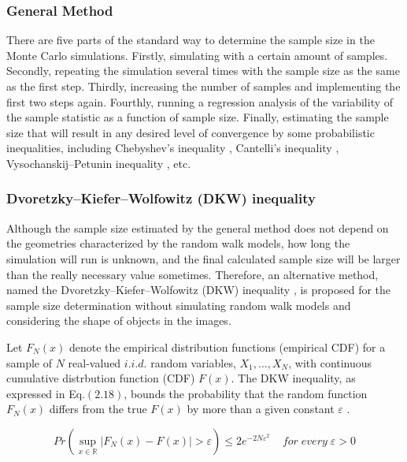 \subsubsection{General Method}

There are five parts of the standard way to determine the sample size
in the Monte Carlo simulations. Firstly, simulating with a certain
amount of samples. Secondly, repeating the simulation several times
with the sample size as the same as the first step.  Thirdly,
increasing the number of samples and implementing the first two steps
again. Fourthly, running a regression analysis of the variability of
the sample statistic as a function of sample size. Finally, estimating
the sample size that will result in any desired level of convergence
by some probabilistic inequalities, including Chebyshev's inequality
\cite{chebyshev1867valeurs}, Cantelli’s inequality
\cite{cantelli1929sui}, Vysochanskij–Petunin inequality
\cite{vysochanskij1980justification}, etc.


\subsubsection{Dvoretzky–Kiefer–Wolfowitz (DKW) inequality}

Although the sample size estimated by the general method does not
depend on the geometries characterized by the random walk models, how
long the simulation will run is unknown, and the final calculated
sample size will be larger than the really necessary value
sometimes. Therefore, an alternative method, named the
Dvoretzky–Kiefer–Wolfowitz (DKW) inequality
\cite{dvoretzky1956asymptotic}, is proposed for the sample size
determination without simulating random walk models and considering
the shape of objects in the images.

Let $F_N(x)$ denote the empirical distribution functions (empirical
CDF) for a sample of $N$ real-valued $i.i.d.$ random variables,
$X_{1}, ... , X_{N}$, with continuous cumulative distrbution function
(CDF) $F(x)$. The DKW inequality, as expressed in Eq.$(2.18)$, bounds the
probability that the random function $F_{N}(x)$ differs from the true
$F(x)$ by more than a given constant $\varepsilon$
\cite{dvoretzky1956asymptotic}.

\begin{equation}
  Pr(\sup_{x \in \mathbb{R}} |F_{N}(x) - F(x)| > \varepsilon) \leq
  2e^{-2N\varepsilon^2} \;\; \;\; for \; every \; \varepsilon > 0
\end{equation}

